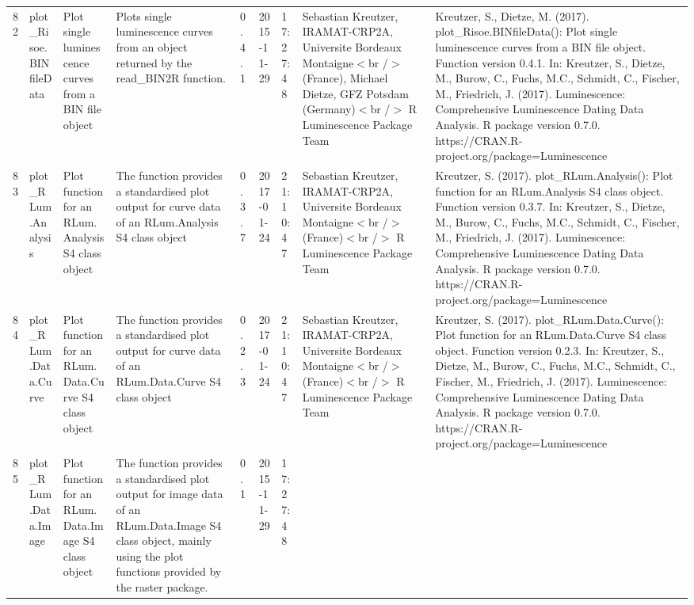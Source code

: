 \begin{table}[ht]
\begin{tabular}{rllllllll}
 \\ 
  82 & plot\_Risoe.BINfileData & Plot single luminescence curves from a BIN file object & Plots single luminescence curves from an object returned by the read\_BIN2R  function. & 0.4.1 & 2015-11-29 & 17:27:48
 & Sebastian Kreutzer, IRAMAT-CRP2A, Universite Bordeaux Montaigne$<$br /$>$ (France),  Michael Dietze, GFZ Potsdam (Germany)$<$br /$>$  R Luminescence Package Team & Kreutzer, S., Dietze, M. (2017). plot\_Risoe.BINfileData(): Plot single luminescence curves from a BIN file object. Function version 0.4.1. In: Kreutzer, S., Dietze, M., Burow, C., Fuchs, M.C., Schmidt, C., Fischer, M., Friedrich, J. (2017). Luminescence: Comprehensive Luminescence Dating Data Analysis. R package version 0.7.0. https://CRAN.R-project.org/package=Luminescence
 \\ 
  83 & plot\_RLum.Analysis & Plot function for an RLum.Analysis S4 class object & The function provides a standardised plot output for curve data of an RLum.Analysis S4 class object & 0.3.7 & 2017-01-24 & 21:10:47
 & Sebastian Kreutzer, IRAMAT-CRP2A, Universite Bordeaux Montaigne$<$br /$>$ (France)$<$br /$>$  R Luminescence Package Team & Kreutzer, S. (2017). plot\_RLum.Analysis(): Plot function for an RLum.Analysis S4 class object. Function version 0.3.7. In: Kreutzer, S., Dietze, M., Burow, C., Fuchs, M.C., Schmidt, C., Fischer, M., Friedrich, J. (2017). Luminescence: Comprehensive Luminescence Dating Data Analysis. R package version 0.7.0. https://CRAN.R-project.org/package=Luminescence
 \\ 
  84 & plot\_RLum.Data.Curve & Plot function for an RLum.Data.Curve S4 class object & The function provides a standardised plot output for curve data of an RLum.Data.Curve S4 class object & 0.2.3 & 2017-01-24 & 21:10:47
 & Sebastian Kreutzer, IRAMAT-CRP2A, Universite Bordeaux Montaigne$<$br /$>$ (France)$<$br /$>$  R Luminescence Package Team & Kreutzer, S. (2017). plot\_RLum.Data.Curve(): Plot function for an RLum.Data.Curve S4 class object. Function version 0.2.3. In: Kreutzer, S., Dietze, M., Burow, C., Fuchs, M.C., Schmidt, C., Fischer, M., Friedrich, J. (2017). Luminescence: Comprehensive Luminescence Dating Data Analysis. R package version 0.7.0. https://CRAN.R-project.org/package=Luminescence
 \\ 
  85 & plot\_RLum.Data.Image & Plot function for an  RLum.Data.Image  S4 class object & The function provides a standardised plot output for image data of an RLum.Data.Image S4 class object, mainly using the plot functions provided by the  raster  package. & 0.1 & 2015-11-29 & 17:27:48

\end{tabular}
\end{table}
